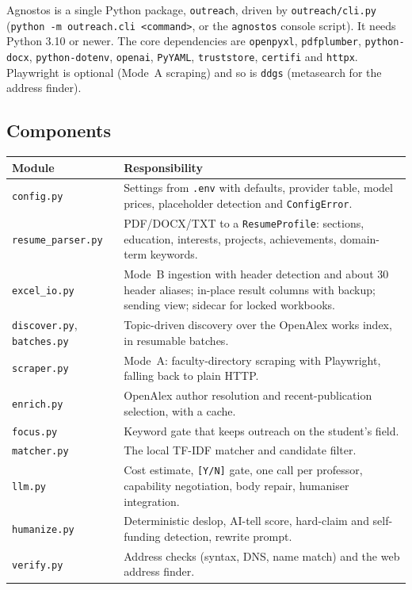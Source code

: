 \documentclass[11pt,a4paper]{article}
\newcommand{\code}[1]{\texttt{#1}}
\begin{document}
Agnostos is a single Python package, \code{outreach}, driven by \code{outreach/cli.py}
(\code{python -m outreach.cli <command>}, or the \code{agnostos} console script). It needs Python
3.10 or newer. The core dependencies are \code{openpyxl}, \code{pdfplumber}, \code{python-docx},
\code{python-dotenv}, \code{openai}, \code{PyYAML}, \code{truststore}, \code{certifi} and
\code{httpx}. Playwright is optional (Mode~A scraping) and so is \code{ddgs} (metasearch for the
address finder).

\subsection{Components}

\begin{tabularx}{\linewidth}{@{}lX@{}}
\toprule
Module & Responsibility \\
\midrule
\code{config.py} & Settings from \code{.env} with defaults, provider table, model prices,
placeholder detection and \code{ConfigError}. \\
\code{resume\_parser.py} & PDF/DOCX/TXT to a \code{ResumeProfile}: sections, education,
interests, projects, achievements, domain-term keywords. \\
\code{excel\_io.py} & Mode~B ingestion with header detection and about 30 header aliases;
in-place result columns with backup; sending view; sidecar for locked workbooks. \\
\code{discover.py}, \code{batches.py} & Topic-driven discovery over the OpenAlex works index,
in resumable batches. \\
\code{scraper.py} & Mode~A: faculty-directory scraping with Playwright, falling back to plain
HTTP. \\
\code{enrich.py} & OpenAlex author resolution and recent-publication selection, with a cache. \\
\code{focus.py} & Keyword gate that keeps outreach on the student's field. \\
\code{matcher.py} & The local TF-IDF matcher and candidate filter. \\
\code{llm.py} & Cost estimate, \code{[Y/N]} gate, one call per professor, capability
negotiation, body repair, humaniser integration. \\
\code{humanize.py} & Deterministic deslop, AI-tell score, hard-claim and self-funding
detection, rewrite prompt. \\
\code{verify.py} & Address checks (syntax, DNS, name match) and the web address finder. \\

\end{tabularx}
\end{document}
